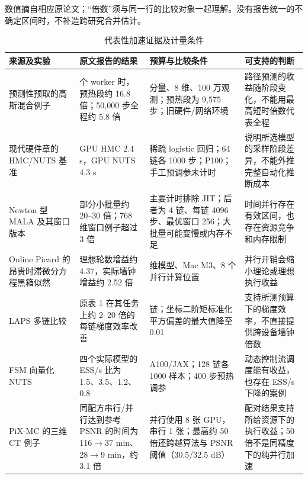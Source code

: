 \documentclass[UTF8,a4paper,zihao=-4,fontset=fandol]{ctexart}
\begin{document}
\begin{table}[htbp]
\centering{}
\caption{代表性加速证据及计量条件}\label{tab:3}
\parbox{\linewidth}{\footnotesize 数值摘自相应原论文；“倍数”须与同一行的比较对象一起理解。没有报告统一的不确定区间时，不补造跨研究合并估计。}\par\smallskip
\begin{tabular}{@{}>{\raggedright\arraybackslash}p{}>{\raggedright\arraybackslash}p{}>{\raggedright\arraybackslash}p{}>{\raggedright\arraybackslash}p{}@{}}
\toprule
来源及实验 & 原文报告的结果 & 预算与比较条件 & 可支持的判断 \\
\midrule
预测性预取的高斯混合例子 \cite{angelino2014} & 64 个 worker 时，预热段约 16.8 倍；50,000 步全程约 5.8 倍 & 8 分量、8 维、100 万观测；预热段为 9,575 步；旧硬件/网络环境 & 路径预测的收益随阶段变化，不能用最高短时倍数代表全程 \\[4pt]
现代硬件章的 HMC/NUTS 基准 \cite{sountsov2026} & GPU HMC 2.4 s，GPU NUTS 4.3 s & 稀疏 logistic 回归；64 链各 1000 步；P100；手工预调参未计时 & 说明所选模型的采样阶段差异，不能外推完整自动化推断成本 \\[4pt]
Newton 型 MALA 及其窗口版本 \cite{zoltowski2025} & 部分小批量约 20–30 倍；768 维窗口例子超过 3 倍 & 主要计时排除 JIT；后者为 4 链、每链 4096 步、最优窗口 256；大批量可能变慢或内存不足 & 时间并行存在有效区间，也存在资源竞争和内存限制 \\[4pt]
Online Picard 的昂贵时滞微分方程黑箱似然 \cite{grazzi2026} & 理想轮数增益约 4.37，实际墙钟增益约 2.52 倍 & 14 维模型、Mac M3、8 个并行计算位置 & 并行开销会缩小理论或理想执行收益 \\[4pt]
LAPS 多链比较 \cite{robnik2026} & 原表 1 在其任务上约 2–20 倍的每链梯度效率改善 & 4096 链；坐标二阶矩标准化平方偏差的最大值降至 0.01 & 支持所测预算下的梯度效率，不直接提供跨设备墙钟倍数 \\[4pt]
FSM 向量化 NUTS \cite{dance2025} & 四个实际模型的 ESS/s 比为 1.5、3.5、1.2、0.8 & A100/JAX；128 链各 1000 样本；400 步预热调参 & 动态控制流调度能有收益，也存在 ESS/s 下降的案例 \\[4pt]
PiX-MC 的三维 CT 例子 \cite{wei2026} & 同配方串行/并行达到参考 PSNR 的时间为 116\(\to\)37 min、28\(\to\)9 min，约 3.1 倍 & 并行使用 8 张 GPU，串行 1 张；最高约 50 倍还跨越算法与 PSNR 阈值（30.5/32.5 dB） & 配对结果支持所给资源下的执行收益；50 倍不是同精度下的纯并行加速 \\[4pt]
\bottomrule
\end{tabular}
\end{table}
\end{document}
